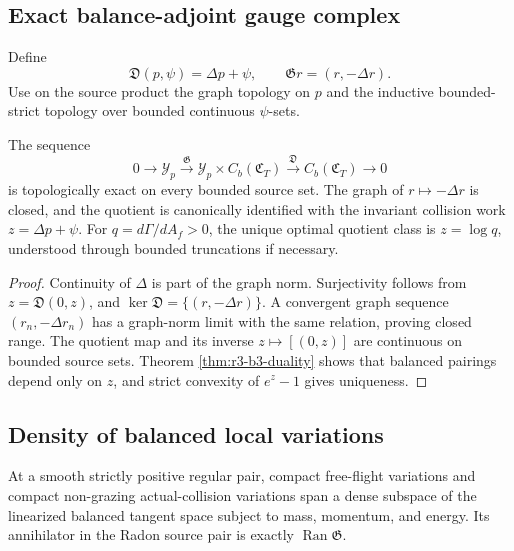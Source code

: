 \subsection{Exact balance-adjoint gauge complex}

Define
\[
 \mathfrak D(p,\psi)=\Delta p+\psi,
 \qquad
 \mathfrak G r=(r,-\Delta r).
\]
Use on the source product the graph topology on \(p\) and the inductive
bounded-strict topology over bounded continuous \(\psi\)-sets.

\begin{theorem}
\label{thm:r3-b3-gauge}
The sequence
\[
 0\longrightarrow\mathcal Y_p
 \xrightarrow{\mathfrak G}
 \mathcal Y_p\times C_b(\mathfrak C_T)
 \xrightarrow{\mathfrak D}
 C_b(\mathfrak C_T)
 \longrightarrow0
\]
is topologically exact on every bounded source set.  The graph of
\(r\mapsto-\Delta r\) is closed, and the quotient is canonically identified
with the invariant collision work \(z=\Delta p+\psi\).  For
\(q=d\Gamma/dA_f>0\), the unique optimal quotient class is
\(z=\log q\), understood through bounded truncations if necessary.
\end{theorem}

\begin{proof}
Continuity of \(\Delta\) is part of the graph norm.  Surjectivity follows
from \(z=\mathfrak D(0,z)\), and
\(\ker\mathfrak D=\{(r,-\Delta r)\}\).  A convergent graph sequence
\((r_n,-\Delta r_n)\) has a graph-norm limit with the same relation, proving
closed range.  The quotient map and its inverse
\(z\mapsto[(0,z)]\) are continuous on bounded source sets.  Theorem
\ref{thm:r3-b3-duality} shows that balanced pairings depend only on \(z\), and
strict convexity of \(e^z-1\) gives uniqueness.
\end{proof}

\subsection{Density of balanced local variations}

\begin{lemma}
\label{lem:r3-b3-local-density}
At a smooth strictly positive regular pair, compact free-flight variations and
compact non-grazing actual-collision variations span a dense subspace of the
linearized balanced tangent space subject to mass, momentum, and energy.  Its
annihilator in the Radon source pair is exactly
\(\operatorname{Ran}\mathfrak G\).
\end{lemma}

